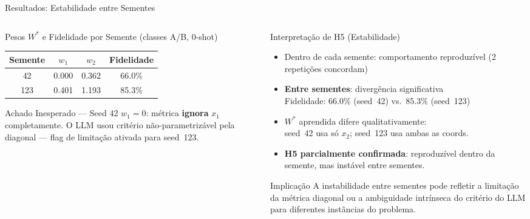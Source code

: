 \documentclass[aspectratio=169, 8pt]{beamer}
\begin{document}
\begin{frame}{Resultados: Estabilidade entre Sementes}
  \begin{columns}[T]
    \begin{column}{0.50\textwidth}
      \begin{block}{Pesos $W^*$ e Fidelidade por Semente (classes A/B, 0-shot)}
        \renewcommand{\arraystretch}{1.35}
        \begin{tabular}{cccc}
          \toprule
          \textbf{Semente} & \textbf{$w_1$} & \textbf{$w_2$} & \textbf{Fidelidade} \\
          \midrule
          42  & 0.000 & 0.362 & 66.0\% \\
          123 & 0.401 & 1.193 & 85.3\% \\
          \bottomrule
        \end{tabular}
      \end{block}

      \vspace{0.4em}

      \begin{alertblock}{Achado Inesperado --- Seed 42}
        \footnotesize
        $w_1 = 0$: métrica \textbf{ignora} $x_1$ completamente.
        O LLM usou critério não-parametrizável pela diagonal ---
        flag de limitação ativada para seed~123.
      \end{alertblock}
    \end{column}

    \begin{column}{0.47\textwidth}
      \begin{block}{Interpretação de H5 (Estabilidade)}
        \footnotesize
        \begin{itemize}
          \item Dentro de cada semente: comportamento reproduzível
            (2 repetições concordam)
          \item \textbf{Entre sementes}: divergência significativa\\
            Fidelidade: $66.0\%$ (seed~42) vs.\ $85.3\%$ (seed~123)
          \item $W^*$ aprendida difere qualitativamente:\\
            seed~42 usa só $x_2$; seed~123 usa ambas as coords.
          \item \textbf{H5 parcialmente confirmada}: reproduzível
            dentro da semente, mas instável entre sementes.
        \end{itemize}
      \end{block}

      \vspace{0.3em}

      \begin{exampleblock}{Implicação}
        \footnotesize
        A instabilidade entre sementes pode refletir a limitação
        da métrica diagonal ou a ambiguidade intrínseca do
        critério do LLM para diferentes instâncias do problema.
      \end{exampleblock}
    \end{column}
  \end{columns}
\end{frame}
\end{document}
